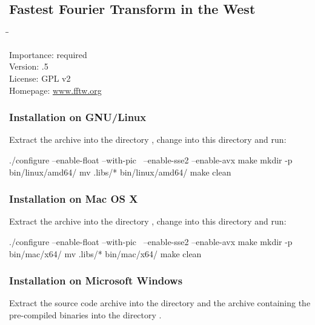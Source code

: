 \subsection{Fastest Fourier Transform in the West}

\begin{tabbing}
  \hspace*{6em}\=\=\kill

  Importance:  \> required \\
  Version:     .5 \\
  License:     \> GPL v2 \\
  Homepage:    \> \href{http://www.fftw.org/}{www.fftw.org}
\end{tabbing}

\subsubsection{Installation on GNU/Linux}

Extract the archive into the directory , change
into this directory and run:

\begin{Verbatim64}
  ./configure --enable-float --with-pic \
    --enable-sse2 --enable-avx
  make
  mkdir -p bin/linux/amd64/
  mv .libs/* bin/linux/amd64/
  make clean
\end{Verbatim64}

\subsubsection{Installation on Mac OS X}

Extract the archive into the directory , change
into this directory and run:

\begin{Verbatim64}
  ./configure --enable-float --with-pic \
    --enable-sse2 --enable-avx
  make
  mkdir -p bin/mac/x64/
  mv .libs/* bin/mac/x64/
  make clean
\end{Verbatim64}

\subsubsection{Installation on Microsoft Windows}

Extract the source code archive into the directory
 and the archive containing the pre-compiled
binaries into the directory .


